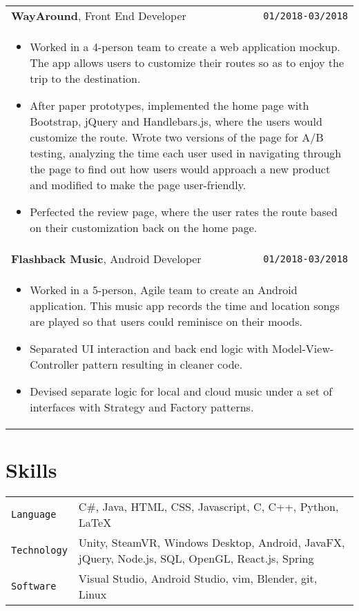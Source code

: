 \documentclass[10pt, letterpaper]{article}
\newcommand{\itemcols}[1]{
	\multicolumn{2}{p{\dimexpr \linewidth-2\tabcolsep}}{
	\begin{itemize}
		#1
	\end{itemize}
	}
}
\begin{document}
\begin{tabularx}{\linewidth}{X r}
	\textbf{\large WayAround}, Front End Developer & \texttt{01/2018-03/2018} \\
	\itemcols{
		\item Worked in a 4-person team to create a web application mockup. The app allows users to customize their routes so as to enjoy the trip to the destination.
		\item After paper prototypes, implemented the home page with Bootstrap, jQuery and Handlebars.js, where the users would customize the route. Wrote two versions of the page for A/B testing, analyzing the time each user used in navigating through the page to find out how users would approach a new product and modified to make the page user-friendly.
		\item Perfected the review page, where the user rates the route based on their customization back on the home page.	
	} \\

	\textbf{\large Flashback Music}, Android Developer & \texttt{01/2018-03/2018} \\
	\itemcols{
		\item Worked in a 5-person, Agile team to create an Android application. This music app records the time and location songs are played so that users could reminisce on their moods.
		\item Separated UI interaction and back end logic with Model-View-Controller pattern resulting in cleaner code.
		\item Devised separate logic for local and cloud music under a set of interfaces with Strategy and Factory patterns.
	}
\end{tabularx}

\begin{comment}
\section{Awards}
\smallskip
\noindent
\begin{tabularx}{\linewidth}{X r}
	10th place at UCSD WIC Beginner's Programming Competition & \texttt{06/2017}
\end{tabularx}
\end{comment}

\section{Skills}
\smallskip
\noindent
\begin{tabularx}{\linewidth}{l X}
	\texttt{Language} & C\#, Java, HTML, CSS, Javascript, C, C++, Python, \LaTeX \\
	\texttt{Technology} & Unity, SteamVR, Windows Desktop, Android, JavaFX, jQuery, Node.js, SQL, OpenGL, React.js, Spring \\
	\texttt{Software} & Visual Studio, Android Studio, vim, Blender, git, Linux
\end{tabularx}

\begin{comment}
\section{Interests}
\smallskip
\noindent
I am fascinated by popular art (comics, games as well as rock music) and always wonder how far computers can take me in creating art. This leads me to minor in Visual Arts.
\end{comment}
\end{document}
